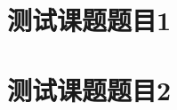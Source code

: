 \documentclass[color=blue]{textbook-cn}%
\newlength{\la}\newlength{\lb}\newlength{\lc}\newlength{\ld}
\begin{document}
\begin{Project}

\makeatletter


	
\section{测试课题题目1}

\begin{Definition}[定义名称]
\lipsum[1]
\end{Definition}

\begin{Theorem}[定理名称]
\lipsum[1]
\end{Theorem}
%
\begin{Axiom}[公理名称]
\lipsum[1]
\end{Axiom}

\begin{Lemma}[引理名称]
\lipsum[1]
\end{Lemma}

\begin{Corollary}[推论名称]
\lipsum[1]
\end{Corollary}

\begin{Proposition}[命题名称]
\lipsum[1]
\end{Proposition}

\begin{Thinking}
\lipsum[2]
\end{Thinking}





\begin{Thinking*}
	\lipsum[2]
\end{Thinking*}


\section{测试课题题目2}

\begin{Definition}[定义名称]
\lipsum[1]
\end{Definition}



\end{Project}
\end{document}
